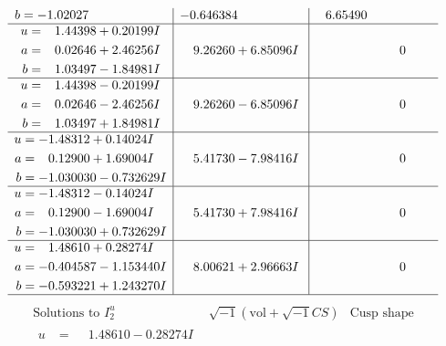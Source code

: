 \documentclass[1p]{elsarticle_modified}
\theoremstyle{definition}
\newcommand{\I}{\sqrt{-1}}
\begin{document}
$$\begin{array}{c|c|c}
\begin{aligned}
b &= -1.02027\phantom{ +0.000000I}\end{aligned}
 & -0.646384\phantom{ +0.000000I} & \phantom{-}6.65490\phantom{ +0.000000I} \\ \hline\begin{aligned}
u &= \phantom{-}1.44398 + 0.20199 I \\
a &= \phantom{-}0.02646 + 2.46256 I \\
b &= \phantom{-}1.03497 - 1.84981 I\end{aligned}
 & \phantom{-}9.26260 + 6.85096 I & \phantom{-0.000000 } 0 \\ \hline\begin{aligned}
u &= \phantom{-}1.44398 - 0.20199 I \\
a &= \phantom{-}0.02646 - 2.46256 I \\
b &= \phantom{-}1.03497 + 1.84981 I\end{aligned}
 & \phantom{-}9.26260 - 6.85096 I & \phantom{-0.000000 } 0 \\ \hline\begin{aligned}
u &= -1.48312 + 0.14024 I \\
a &= \phantom{-}0.12900 + 1.69004 I \\
b &= -1.030030 - 0.732629 I\end{aligned}
 & \phantom{-}5.41730 - 7.98416 I & \phantom{-0.000000 } 0 \\ \hline\begin{aligned}
u &= -1.48312 - 0.14024 I \\
a &= \phantom{-}0.12900 - 1.69004 I \\
b &= -1.030030 + 0.732629 I\end{aligned}
 & \phantom{-}5.41730 + 7.98416 I & \phantom{-0.000000 } 0 \\ \hline\begin{aligned}
u &= \phantom{-}1.48610 + 0.28274 I \\
a &= -0.404587 - 1.153440 I \\
b &= -0.593221 + 1.243270 I\end{aligned}
 & \phantom{-}8.00621 + 2.96663 I & \phantom{-0.000000 } 0\\
 \hline 
 \end{array}$$\newpage$$\begin{array}{c|c|c}  
\text{Solutions to }I^u_{2}& \I (\text{vol} + \sqrt{-1}CS) & \text{Cusp shape}\\
 \hline 
\begin{aligned}
u &= \phantom{-}1.48610 - 0.28274 I \\

\end{aligned}
\end{array}$$
\end{document}
